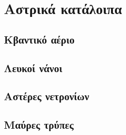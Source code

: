 \chapter{Αστρικά κατάλοιπα}
\label{ch:Chapter6}

\section{Κβαντικό αέριο}

\section{Λευκοί νάνοι}

\section{Αστέρες νετρονίων}

\section{Μαύρες τρύπες}